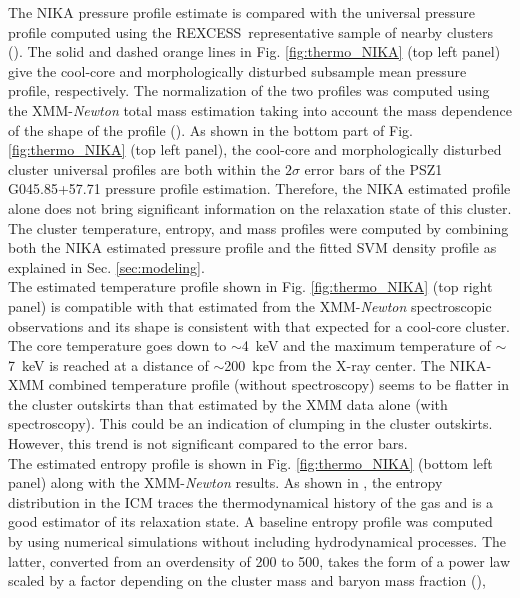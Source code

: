 \documentclass[traditabstract]{aa}
\newcommand{\rexcess}{{\gwpfont REXCESS}}
\begin{document}
\indent The NIKA pressure profile estimate is compared with the universal pressure profile computed using the \rexcess\ representative sample of nearby clusters (\citealt{boe07,universal}). The solid and dashed orange lines in Fig. \ref{fig:thermo_NIKA} (top left panel) give the cool-core and morphologically disturbed subsample mean pressure profile, respectively. The normalization of the two profiles was computed using the XMM-{\it Newton} total mass estimation taking into account the mass dependence of the shape of the profile (\citealt{universal}). As shown in the bottom part of Fig. \ref{fig:thermo_NIKA} (top left panel), the cool-core and morphologically disturbed cluster universal profiles are both within the $2\sigma$ error bars of the \mbox{PSZ1\,G045.85+57.71} pressure profile estimation. Therefore, the NIKA estimated profile alone does not bring significant information on the relaxation state of this cluster.\\
\indent The cluster temperature, entropy, and mass profiles were computed by combining both the NIKA estimated pressure profile and the fitted SVM density profile as explained in Sec. \ref{sec:modeling}.\\
\indent The estimated temperature profile shown in Fig. \ref{fig:thermo_NIKA} (top right panel) is compatible with that estimated from the XMM-{\it Newton} spectroscopic observations and its shape is consistent with that expected for a cool-core cluster. The core temperature goes down to $\sim$4~keV and the maximum temperature of  $\sim$7~keV is reached at a distance of $\sim$200~kpc from the X-ray center. The NIKA-XMM combined temperature profile (without spectroscopy) seems to be flatter in the cluster outskirts than that estimated by the XMM data alone (with spectroscopy). This could be an indication of clumping in the cluster outskirts. However, this trend is not significant compared to the error bars.\\
\indent The estimated entropy profile is shown in Fig. \ref{fig:thermo_NIKA} (bottom left panel) along with the XMM-{\it Newton} results. As shown in \citealt{Voit_cosmo}, the entropy distribution in the ICM traces the thermodynamical history of the gas and is a good estimator of its relaxation state. A baseline entropy profile was computed by \citealt{entropy_base} using numerical simulations without including hydrodynamical processes. The latter, converted from an overdensity of 200 to 500, takes the form of a power law scaled by a factor depending on the cluster mass and baryon mass fraction (\citealt{entropy_REXCESS}), 
\end{document}
